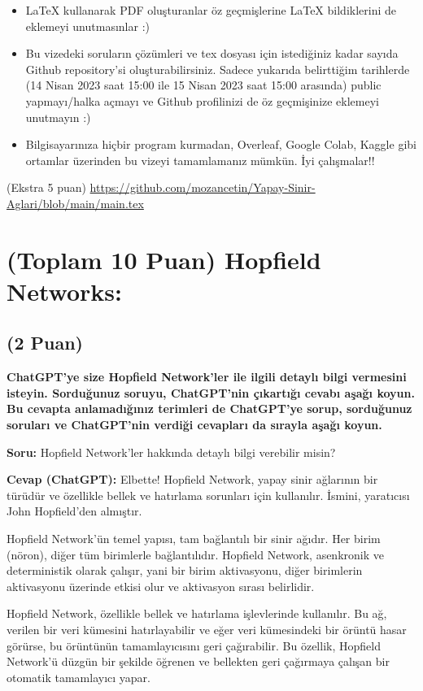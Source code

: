 \documentclass[11pt]{article}
\begin{document}
\begin{itemize}
    \item LaTeX kullanarak PDF oluşturanlar öz geçmişlerine LaTeX bildiklerini de eklemeyi unutmasınlar :)
    \item Bu vizedeki soruların çözümleri ve tex dosyası için istediğiniz kadar sayıda Github repository'si oluşturabilirsiniz. Sadece yukarıda belirttiğim tarihlerde (14 Nisan 2023 saat 15:00 ile 15 Nisan 2023 saat 15:00 arasında) public yapmayı/halka açmayı ve Github profilinizi de öz geçmişinize eklemeyi unutmayın :)
    \item Bilgisayarınıza hiçbir program kurmadan, Overleaf, Google Colab, Kaggle gibi ortamlar üzerinden bu vizeyi tamamlamanız mümkün. İyi çalışmalar!!
\end{itemize}

(Ekstra 5 puan) \url{https://github.com/mozancetin/Yapay-Sinir-Aglari/blob/main/main.tex}

\newpage
\section{(Toplam 10 Puan) Hopfield Networks:}

\subsection{(2 Puan)} \textbf{ChatGPT’ye size Hopfield Network’ler ile ilgili detaylı bilgi vermesini isteyin. Sorduğunuz soruyu, ChatGPT'nin çıkartığı cevabı aşağı koyun. Bu cevapta anlamadığınız terimleri de ChatGPT’ye sorup, sorduğunuz soruları ve ChatGPT’nin verdiği cevapları da sırayla aşağı koyun.}

\textbf{Soru:} 
Hopfield Network'ler hakkında detaylı bilgi verebilir misin?

\textbf{Cevap (ChatGPT):}
Elbette! Hopfield Network, yapay sinir ağlarının bir türüdür ve özellikle bellek ve hatırlama sorunları için kullanılır. İsmini, yaratıcısı John Hopfield'den almıştır.

Hopfield Network'ün temel yapısı, tam bağlantılı bir sinir ağıdır. Her birim (nöron), diğer tüm birimlerle bağlantılıdır. Hopfield Network, asenkronik ve deterministik olarak çalışır, yani bir birim aktivasyonu, diğer birimlerin aktivasyonu üzerinde etkisi olur ve aktivasyon sırası belirlidir.

Hopfield Network, özellikle bellek ve hatırlama işlevlerinde kullanılır. Bu ağ, verilen bir veri kümesini hatırlayabilir ve eğer veri kümesindeki bir örüntü hasar görürse, bu örüntünün tamamlayıcısını geri çağırabilir. Bu özellik, Hopfield Network'ü düzgün bir şekilde öğrenen ve bellekten geri çağırmaya çalışan bir otomatik tamamlayıcı yapar.
\end{document}
